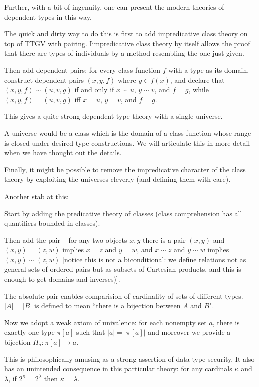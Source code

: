 \documentclass[12pt]{article}
\begin{document}
Further, with a bit of ingenuity, one can present the modern theories of dependent types in this way.

The quick and dirty way to do this is first to add impredicative class theory on top of TTGV with pairing.   Iimpredicative class theory by itself allows the proof that there are types of individuals by a method resembling the one just given.

Then add dependent pairs:  for every class function $f$ with a type as its domain, construct dependent pairs
$(x,y,f)$ where $y \in f(x)$, and declare that $(x,y,f) \sim (u,v,g)$ if and only if $x \sim u$, $y \sim v$, and $f=g$, while
$(x,y,f)=(u,v,g)$ iff $x=u$, $y=v$, and $f=g$.

This gives a quite strong dependent type theory with a single universe.

A universe would be a class which is the domain of a class function whose range is closed under desired type constructions.  We will articulate this in more detail when we have thought out the details.

Finally, it might be possible to remove the impredicative character of the class theory by exploiting the universes cleverly
(and defining them with care).

Another stab at this:

Start by adding the predicative theory of classes (class comprehension has all quantifiers bounded in classes).

Then add the pair -- for any two objects $x,y$ there is a pair $(x,y)$ and $(x,y)=(z,w)$ implies $x=z$ and $y=w$,
and $x \sim z$ and $y \sim w$ implies $(x,y) \sim (z,w)$ [notice this is not a biconditional:  we define relations not
as general sets of ordered pairs but as subsets of Cartesian products, and this is enough to get domains and inverses)].

The absolute pair enables comparision of cardinality of sets of different types.  $|A|=|B|$ is defined to mean
``there is a bijection between $A$ and $B$".

Now we adopt a weak axiom of univalence:  for each nonempty set $a$, there is exactly one type $\pi[a]$ such
that $|a|=|\pi[a]|$ and moreover we provide a bijection $\Pi_a:\pi[a] \rightarrow a$.

This is philosophically amusing as a strong assertion of data type security.  It also has an unintended consequence
in this particular theory:  for any cardinals $\kappa$ and $\lambda$, if $2^\kappa = 2^\lambda$ then $\kappa=\lambda$.
\end{document}
